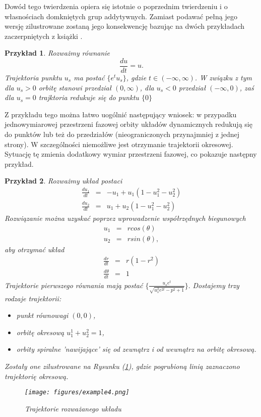 \documentclass[12pt]{article}
\newtheorem{przyklad}{Przykład}
\begin{document}
Dowód tego twierdzenia opiera się istotnie o poprzednim twierdzeniu i o własnościach domkniętych grup addytywnych. Zamiast podawać pełną jego wersję zilustrowane zostaną jego konsekwencję bazując na dwóch przykładach zaczerpniętych z książki \cite{Palczewski}.
\begin{przyklad}
	Rozważmy równanie
	\begin{equation}
	\frac{du}{dt} = u.
	\end{equation}
	Trajektoria punktu $ u_{s} $ ma postać $ \{e^tu_{s}\} $, gdzie $ t \in (-\infty,\infty) $. W związku z tym dla $ u_{s} > 0 $ orbitę stanowi przedział $ (0,\infty) $, dla $ u_{s} < 0 $ przedział $ (-\infty,0) $, zaś dla $ u_{s} = 0 $ trajktoria redukuje się do punktu $ \{0\} $
\end{przyklad}
Z przykładu tego można łatwo uogólnić następujący wniosek: w przypadku jednowymiarowej przestrzeni fazowej orbity układów dynamicznych redukują się do punktów lub też do przedziałów (nieograniczonych przynajmniej z jednej strony). W szczególności niemożliwe jest otrzymanie trajektorii okresowej. Sytuację tę zmienia dodatkowy wymiar przestrzeni fazowej, co pokazuje następny przykład.
\begin{przyklad}
	Rozważmy układ postaci
	\begin{equation}
	\begin{array}{rcr} 
		\frac{du_{1}}{dt} & = & -u_{1} + u_{1}(1 - u_{1}^2 - u_{2}^2) \\ 
		\frac{du_{2}}{dt} & = & u_{1} + u_{2}(1 - u_{1}^2 - u_{2}^2)
		\end{array}
	\end{equation}
	Rozwiązanie można uzyskać poprzez wprowadzenie współrzędnych biegunowych
	\begin{equation}
	\begin{array}{rcr} 
	u_{1} & = & rcos(\theta) \\ 
	u_{2} & = & rsin(\theta),
	\end{array}
	\end{equation}
	aby otrzymać układ
	\begin{equation}
	\begin{array}{rcl} 
	\frac{dr}{dt} & = & r(1-r^2) \\ 
	\frac{d\theta}{dt} & = & 1
	\end{array}
	\end{equation}
	Trajektorie pierwszego równania mają postać $ \{\frac{u_{s}e^t}{\sqrt{u_{s}^2e^{2t}-p^2+1}}\}. $ Dostajemy trzy rodzaje trajektorii:
	\begin{itemize}
		\item punkt równowagi $ (0,0) $,
		\item orbitę okresową $ u_{1}^1 + u_{2}^2 = 1 $,
		\item orbity spiralne 'nawijające' się od zewnątrz i od wewnątrz na orbitę okresową.
	\end{itemize}
	Zostały one zilustrowane na Rysunku (\ref{Fig5}), gdzie pogrubioną linią zaznaczono trajektorię okresową.
	\begin{figure}[H]
		\texttt{[image: figures/example4.png]} 
		\centering
		\caption{Trajektorie rozważanego układu}
		\label{Fig5}
	\end{figure}
\end{przyklad}
\end{document}
